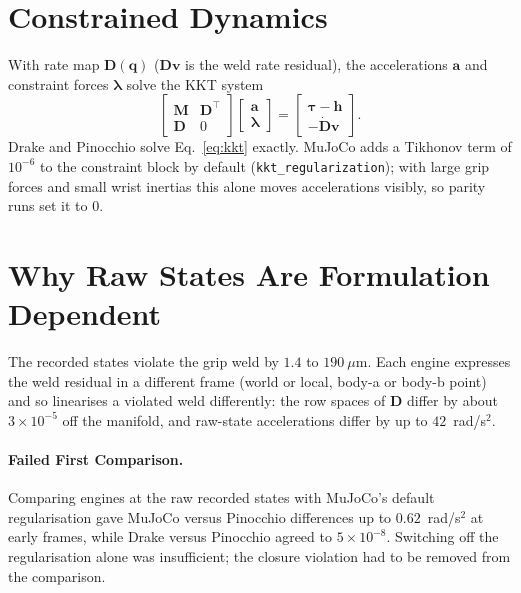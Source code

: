 \documentclass[11pt,a4paper]{article}
\newcommand{\bM}{\mathbf{M}}
\newcommand{\bD}{\mathbf{D}}
\newcommand{\bq}{\mathbf{q}}
\newcommand{\bv}{\mathbf{v}}
\newcommand{\ba}{\mathbf{a}}
\newcommand{\bh}{\mathbf{h}}
\newcommand{\bt}{\boldsymbol{\tau}}
\newcommand{\bl}{\boldsymbol{\lambda}}
\begin{document}
\section{Constrained Dynamics}
With rate map $\bD(\bq)$ ($\bD\bv$ is the weld rate residual), the
accelerations $\ba$ and constraint forces $\bl$ solve the KKT system
\begin{equation}
\begin{bmatrix}\bM & \bD^{\top}\\ \bD & 0\end{bmatrix}
\begin{bmatrix}\ba\\ \bl\end{bmatrix}
=\begin{bmatrix}\bt-\bh\\ -\dot{\bD}\bv\end{bmatrix}.
\label{eq:kkt}
\end{equation}
Drake and Pinocchio solve Eq.~\eqref{eq:kkt} exactly.  MuJoCo adds a Tikhonov
term of $10^{-6}$ to the constraint block by default
(\texttt{kkt\_regularization}); with large grip forces and small wrist inertias
this alone moves accelerations visibly, so parity runs set it to $0$.

\section{Why Raw States Are Formulation Dependent}
The recorded states violate the grip weld by $1.4$ to $190~\mu$m.  Each engine
expresses the weld residual in a different frame (world or local, body-a or
body-b point) and so linearises a violated weld differently: the row spaces of
$\bD$ differ by about $3\times10^{-5}$ off the manifold, and raw-state
accelerations differ by up to $42$~rad/s$^2$.

\paragraph{Failed First Comparison.}  Comparing engines at the raw recorded
states with MuJoCo's default regularisation gave MuJoCo versus Pinocchio
differences up to $0.62$~rad/s$^2$ at early frames, while Drake versus Pinocchio
agreed to $5\times10^{-8}$.  Switching off the regularisation alone was
insufficient; the closure violation had to be removed from the comparison.
\end{document}
